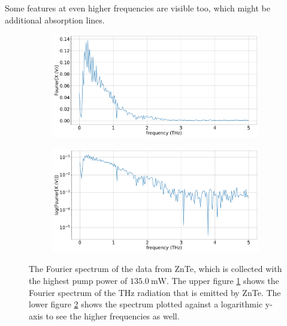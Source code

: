 Some features at even higher frequencies are visible too, which might be additional absorption lines.
\begin{figure}%
    \centering
    \begin{subfigure}{.5\textwidth}%
        \centering
        \includegraphics[width=\textwidth]{Plots/2_11_30_20normalFX.pdf}%
        \caption{}
        \label{fig:2_11_30_20_fft}%
    \end{subfigure}%
    \hfill%
    \begin{subfigure}{.5\textwidth}%
        \centering
        \includegraphics[width=\textwidth]{Plots/2_11_30_20normallog(FX).pdf}%
        \caption{}
        \label{fig:2_11_30_20_fft_log}%
    \end{subfigure}%
    \caption{The Fourier spectrum of the data from ZnTe, which is collected with the highest pump power of $\SI{135.0}{\milli\W}$.
    The upper figure \ref{fig:2_11_30_20_fft} shows the Fourier spectrum of the $\si{\tera\hertz}$ radiation that is emitted by ZnTe.
    The lower figure \ref{fig:2_11_30_20_fft_log} shows the spectrum plotted against a logarithmic y-axis to see the higher frequencies as well.}%
    \label{fig:fourier_znte}%
\end{figure}\FloatBarrier
